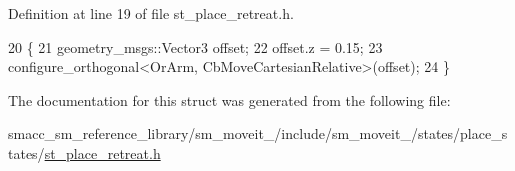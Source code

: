 Definition at line 19 of file st\+\_\+place\+\_\+retreat.\+h.


\begin{DoxyCode}
20     \{
21         geometry\_msgs::Vector3 offset;
22         offset.z = 0.15;
23         configure\_orthogonal<OrArm, CbMoveCartesianRelative>(offset);
24     \}
\end{DoxyCode}


The documentation for this struct was generated from the following file\+:\begin{DoxyCompactItemize}
\item 
smacc\+\_\+sm\+\_\+reference\+\_\+library/sm\+\_\+moveit\+\_/include/sm\+\_\+moveit\+\_/states/place\+\_\+states/\hyperlink{2_2include_2sm__moveit__2_2states_2place__states_2st__place__retreat_8h}{st\+\_\+place\+\_\+retreat.\+h}\end{DoxyCompactItemize}
